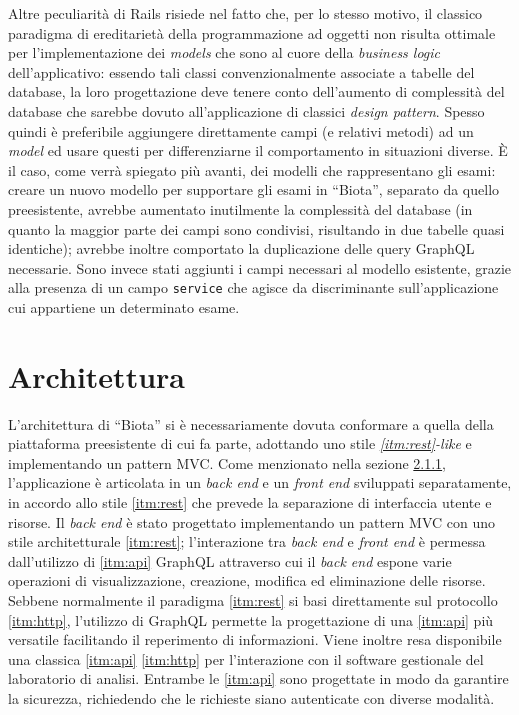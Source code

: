 Altre peculiarità di Rails risiede nel fatto che, per lo stesso motivo, il classico paradigma di ereditarietà della programmazione ad oggetti non risulta ottimale per l'implementazione dei \textit{models} che sono al cuore della \textit{business logic} dell'applicativo: essendo tali classi convenzionalmente associate a tabelle del database, la loro progettazione deve tenere conto dell'aumento di complessità del database che sarebbe dovuto all'applicazione di classici \textit{design pattern}. Spesso quindi è preferibile aggiungere direttamente campi (e relativi metodi) ad un \textit{model} ed usare questi per differenziarne il comportamento in situazioni diverse. È il caso, come verrà spiegato più avanti, dei modelli che rappresentano gli esami: creare un nuovo modello per supportare gli esami in ``Biota'', separato da quello preesistente, avrebbe aumentato inutilmente la complessità del database (in quanto la maggior parte dei campi sono condivisi, risultando in due tabelle quasi identiche); avrebbe inoltre comportato la duplicazione delle query GraphQL necessarie. Sono invece stati aggiunti i campi necessari al modello esistente, grazie alla presenza di un campo \texttt{service} che agisce da discriminante sull'applicazione cui appartiene un determinato esame.

\section{Architettura}
L'architettura di ``Biota'' si è necessariamente dovuta conformare a quella della piattaforma preesistente di cui fa parte, adottando uno stile \textit{\ref{itm:rest}-like} e implementando un pattern MVC. Come menzionato nella sezione \hyperref[sec:devctx]{2.1.1}, l'applicazione è articolata in un \textit{back end} e un \textit{front end} sviluppati separatamente, in accordo allo stile \ref{itm:rest} che prevede la separazione di interfaccia utente e risorse. Il \textit{back end} è stato progettato implementando un pattern MVC con uno stile architetturale \ref{itm:rest}; l'interazione tra \textit{back end} e \textit{front end} è permessa dall'utilizzo di \ref{itm:api} GraphQL attraverso cui il \textit{back end} espone varie operazioni di visualizzazione, creazione, modifica ed eliminazione delle risorse. Sebbene normalmente il paradigma \ref{itm:rest} si basi direttamente sul protocollo \ref{itm:http}, l'utilizzo di GraphQL permette la progettazione di una \ref{itm:api} più versatile facilitando il reperimento di informazioni. Viene inoltre resa disponibile una classica \ref{itm:api} \ref{itm:http} per l'interazione con il software gestionale del laboratorio di analisi. Entrambe le \ref{itm:api} sono progettate in modo da garantire la sicurezza, richiedendo che le richieste siano autenticate con diverse modalità. 

